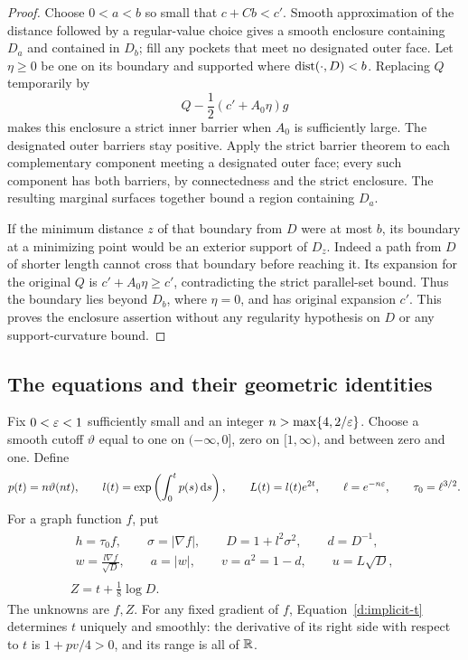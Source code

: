 \begin{proof}
Choose $0<a<b$ so small that $c+Cb<c'$.  Smooth approximation of the
distance followed by a regular-value choice gives a smooth enclosure
containing $D_a$ and contained in $D_b$; fill any pockets that meet no
designated outer face.  Let $\eta\ge0$ be one on its boundary and
supported where $\operatorname{dist}(\cdot,D)<b$.  Replacing $Q$ temporarily by
\[
 Q-\frac12(c'+A_0\eta)g
\]
makes this enclosure a strict inner barrier when $A_0$ is sufficiently
large.  The designated outer barriers stay positive.  Apply the
strict barrier theorem to each complementary component meeting a
designated outer face; every such component has both barriers, by
connectedness and the strict enclosure.  The resulting marginal
surfaces together bound a region containing $D_a$.

If the minimum distance $z$ of that boundary from $D$ were at most
$b$, its boundary at a minimizing point would be an exterior support
of $D_z$.  Indeed a path from $D$ of shorter length cannot cross that
boundary before reaching it.  Its expansion for the original $Q$
is $c'+A_0\eta\ge c'$, contradicting the strict parallel-set bound.
Thus the boundary lies beyond $D_b$, where $\eta=0$, and has original
expansion $c'$.  This proves the enclosure assertion without any
regularity hypothesis on $D$ or any support-curvature bound.
\end{proof}

\subsection{The equations and their geometric identities}\label{d:equations}

Fix $0<\varepsilon<1$ sufficiently small and an integer
$n>\max\{4,2/\varepsilon\}$.  Choose a smooth cutoff $\vartheta$ equal to
one on $(-\infty,0]$, zero on $[1,\infty)$, and between zero and one.
Define
\begin{equation}\label{d:profiles}
 p(t)=n\vartheta(nt),\qquad
 l(t)=\exp\left(\int_0^t p(s)\,\mathrm d s\right),\qquad
 L(t)=l(t)e^{2t},\qquad
 \ell=e^{-n\varepsilon},\qquad \tau_0=\ell^{3/2}.
\end{equation}
For a graph function $f$, put
\begin{gather}\label{d:variables}
 \begin{gathered}
 h=\tau_0f,\qquad \sigma=|\nabla f|,\qquad D=1+l^2\sigma^2,\qquad
 d=D^{-1},\\
 w=\frac{l\nabla f}{\sqrt D},\qquad
 a=|w|,\qquad v=a^2=1-d,\qquad u=L\sqrt D,
 \end{gathered}\\
 Z=t+\frac18\log D.
 \label{d:implicit-t}
\end{gather}
The unknowns are $f,Z$.  For any fixed gradient of $f$,
Equation~\eqref{d:implicit-t} determines $t$ uniquely and smoothly:
the derivative of its right side with respect to $t$ is
$1+pv/4>0$, and its range is all of $\mathbb R$.

